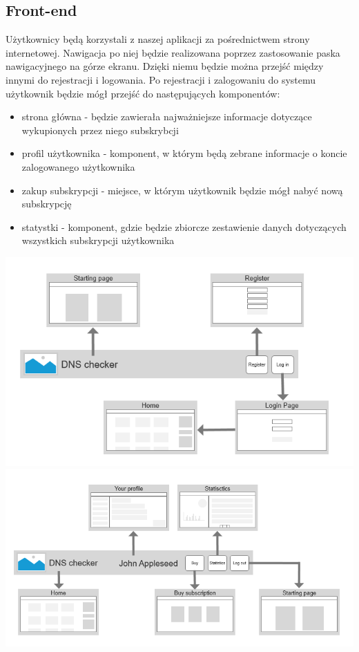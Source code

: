 \subsection{Front-end}

\hspace{0.5cm} Użytkownicy będą korzystali z naszej aplikacji za pośrednictwem strony internetowej. Nawigacja po niej będzie realizowana poprzez zastosowanie paska nawigacyjnego na górze ekranu. Dzięki niemu będzie można przejść między innymi do rejestracji i logowania. Po rejestracji i zalogowaniu do systemu użytkownik będzie mógł przejść do następujących komponentów:
\begin{itemize}

    \item strona główna - będzie zawierała najważniejsze informacje dotyczące wykupionych przez niego subskrybcji
    \item profil użytkownika - komponent, w którym będą zebrane informacje o koncie zalogowanego użytkownika
    \item zakup subskrypcji - miejsce, w którym użytkownik będzie mógł nabyć nową subskrypcję
    \item statystki - komponent, gdzie będzie zbiorcze zestawienie danych dotyczących wszystkich subskrypcji użytkownika
\end{itemize}
\begin{center}
    \includegraphics[scale=0.75]{sitemap_not_li.png}
    \includegraphics[scale=0.75]{sitemap_logged_in.png}
\end{center}
